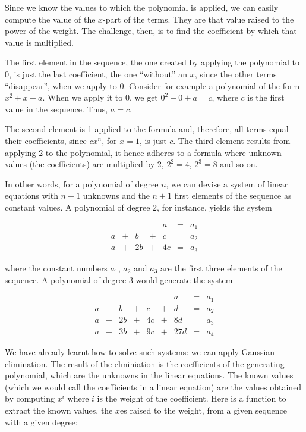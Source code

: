 \documentclass[tikz]{scrreprt}
\begin{document}
Since we know the values to which the polynomial is applied,
we can easily compute the value of the $x$-part of the terms.
They are that value raised to the power of the weight.
The challenge, then, is to find the coefficient by which
that value is multiplied.

The first element in the sequence, the one created by applying
the polynomial to 0, is just the last coefficient,
the one ``without'' an $x$, since the other terms ``disappear'',
when we apply to 0. Consider for example a polynomial of the form
$x^2 + x + a$. When we apply it to 0,
we get $0^2 + 0 + a = c$, where $c$ is the first
value in the sequence. Thus, $a=c$.

The second element is 1 applied to the formula and, therefore,
all terms equal their coefficients, since $cx^n$, for $x=1$, 
is just $c$. The third element results from applying 2 to the polynomial,
it hence adheres to a formula where unknown values (the coefficients)
are multiplied by $2$, $2^2=4$, $2^3=8$ and so on.

In other words, for a polynomial of degree $n$, we can devise
a system of linear equations with $n+1$ unknowns and
the $n+1$ first elements of the sequence as constant values.
A polynomial of degree 2, for instance, yields the system

\begin{equation}
\begin{array}{rcrcrcr}
    &   &    &   & a  & = &  a_1 \\
  a & + & b  & + & c  & = &  a_2 \\
  a & + & 2b & + & 4c & = &  a_3
\end{array}
\end{equation}

where the constant numbers $a_1$, $a_2$ and $a_3$
are the first three elements of the sequence.
A polynomial of degree 3 would generate the system

\begin{equation}
\begin{array}{rcrcrcrcr}
    &   &    &   &    &   &   a & = &  a_1 \\
  a & + &  b & + &  c & + &   d & = &  a_2 \\
  a & + & 2b & + & 4c & + &  8d & = &  a_3 \\
  a & + & 3b & + & 9c & + & 27d & = &  a_4 
\end{array}
\end{equation}

We have already learnt how to solve such systems:
we can apply Gaussian elimination.
The result of the elminiation is 
the coefficients of the generating polynomial,
which are the unknowns in the linear equations.
The known values (which we would call the coefficients
in a linear equation) are the values obtained
by computing $x^i$ where $i$ is the weight 
of the coefficient.
Here is a function to extract the known values,
the $x$es raised to the weight, from a given 
sequence with a given degree:
\end{document}
